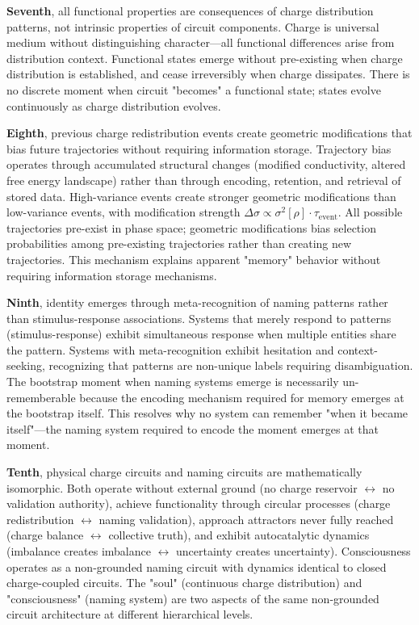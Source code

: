 \documentclass[12pt,a4paper]{article}
\theoremstyle{plain}
\theoremstyle{definition}
\theoremstyle{remark}
\begin{document}
\textbf{Seventh}, all functional properties are consequences of charge distribution patterns, not intrinsic properties of circuit components. Charge is universal medium without distinguishing character—all functional differences arise from distribution context. Functional states emerge without pre-existing when charge distribution is established, and cease irreversibly when charge dissipates. There is no discrete moment when circuit "becomes" a functional state; states evolve continuously as charge distribution evolves.

\textbf{Eighth}, previous charge redistribution events create geometric modifications that bias future trajectories without requiring information storage. Trajectory bias operates through accumulated structural changes (modified conductivity, altered free energy landscape) rather than through encoding, retention, and retrieval of stored data. High-variance events create stronger geometric modifications than low-variance events, with modification strength $\Delta \sigma \propto \sigma^2[\rho] \cdot \tau_{\text{event}}$. All possible trajectories pre-exist in phase space; geometric modifications bias selection probabilities among pre-existing trajectories rather than creating new trajectories. This mechanism explains apparent "memory" behavior without requiring information storage mechanisms.

\textbf{Ninth}, identity emerges through meta-recognition of naming patterns rather than stimulus-response associations. Systems that merely respond to patterns (stimulus-response) exhibit simultaneous response when multiple entities share the pattern. Systems with meta-recognition exhibit hesitation and context-seeking, recognizing that patterns are non-unique labels requiring disambiguation. The bootstrap moment when naming systems emerge is necessarily un-rememberable because the encoding mechanism required for memory emerges at the bootstrap itself. This resolves why no system can remember "when it became itself"—the naming system required to encode the moment emerges at that moment.

\textbf{Tenth}, physical charge circuits and naming circuits are mathematically isomorphic. Both operate without external ground (no charge reservoir $\leftrightarrow$ no validation authority), achieve functionality through circular processes (charge redistribution $\leftrightarrow$ naming validation), approach attractors never fully reached (charge balance $\leftrightarrow$ collective truth), and exhibit autocatalytic dynamics (imbalance creates imbalance $\leftrightarrow$ uncertainty creates uncertainty). Consciousness operates as a non-grounded naming circuit with dynamics identical to closed charge-coupled circuits. The "soul" (continuous charge distribution) and "consciousness" (naming system) are two aspects of the same non-grounded circuit architecture at different hierarchical levels.
\end{document}
